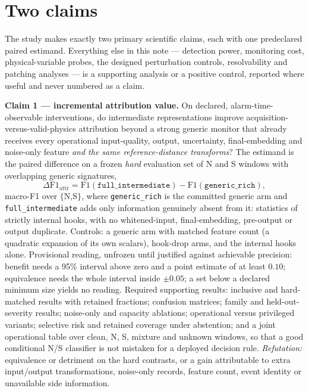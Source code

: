 \documentclass[10pt,twocolumn]{extarticle}
\begin{document}
\section{Two claims}
\label{sec:claims}

The study makes exactly two primary scientific claims, each with one
predeclared paired estimand. Everything else in this note --- detection power,
monitoring cost, physical-variable probes, the designed perturbation
controls, resolvability and patching analyses --- is a supporting analysis or
a positive control, reported where useful and never numbered as a claim.

\textbf{Claim 1 --- incremental attribution value.} On declared,
alarm-time-observable interventions, do intermediate representations improve
acquisition-versus-valid-physics attribution beyond a strong generic monitor
that already receives every operational input-quality, output, uncertainty,
final-embedding and noise-only feature \emph{and the same reference-distance
transforms}? The estimand is the paired difference on a frozen \emph{hard}
evaluation set of N and S windows with overlapping generic signatures,
\[
\Delta\mathrm{F1}_{\mathrm{attr}}=\mathrm{F1}(\texttt{full\_intermediate})-\mathrm{F1}(\texttt{generic\_rich}),
\]
macro-F1 over $\{$N,S$\}$,
where \texttt{generic\_rich} is the committed generic arm and
\texttt{full\_intermediate} adds only information genuinely absent from it:
statistics of strictly internal hooks, with no whitened-input, final-embedding,
pre-output or output duplicate. Controls: a generic arm with matched feature
count (a quadratic expansion of its own scalars), hook-drop arms, and the
internal hooks alone. Provisional reading, unfrozen until justified against
achievable precision: benefit needs a 95\% interval above zero and a point
estimate of at least $0.10$; equivalence needs the whole interval inside
$\pm0.05$; a set below a declared minimum size yields no reading. Required
supporting results: inclusive and hard-matched results with retained
fractions; confusion matrices; family and held-out-severity results;
noise-only and capacity ablations; operational versus privileged variants;
selective risk and retained coverage under abstention; and a joint operational
table over clean, N, S, mixture and unknown windows, so that a good
conditional N/S classifier is not mistaken for a deployed decision rule.
\emph{Refutation:} equivalence or detriment on the hard contrasts, or a gain
attributable to extra input/output transformations, noise-only records,
feature count, event identity or unavailable side information.
\end{document}
